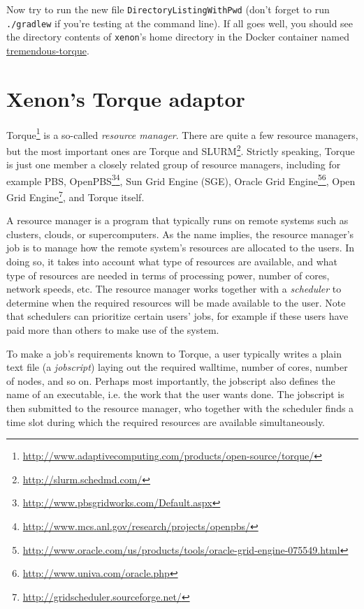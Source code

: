 \documentclass[12pt, a4paper, twoside, openany, titlepage]{book}
\begin{document}
Now try to run the new file \texttt{DirectoryListingWithPwd} (don't forget to run \texttt{./gradlew} if you're testing at the command line). If all goes well, you should see the directory contents of \texttt{xenon}'s home directory in the Docker container named \url{tremendous-torque}.

\section{Xenon's Torque adaptor}

Torque\footnote{\url{http://www.adaptivecomputing.com/products/open-source/torque/}} is a so-called \textit{resource manager}. There are quite a few resource managers, but the most important ones are Torque and SLURM\footnote{\url{http://slurm.schedmd.com/}}. Strictly speaking, Torque is just one member a closely related group of resource managers, including for example PBS, OpenPBS\footnote{\url{http://www.pbsgridworks.com/Default.aspx}}\footnote{\url{http://www.mcs.anl.gov/research/projects/openpbs/}}, Sun Grid Engine (SGE), Oracle Grid Engine\footnote{\url{http://www.oracle.com/us/products/tools/oracle-grid-engine-075549.html}}\footnote{\url{http://www.univa.com/oracle.php}}, Open Grid Engine\footnote{\url{http://gridscheduler.sourceforge.net/}}, and Torque itself.

A resource manager is a program that typically runs on remote systems such as clusters, clouds, or supercomputers. As the name implies, the resource manager's job is to manage how the remote system's resources are allocated to the users. In doing so, it takes into account what type of resources are available, and what type of resources are needed in terms of processing power, number of cores, network speeds, etc. The resource manager works together with a \textit{scheduler} to determine when the required resources will be made available to the user. Note that schedulers can prioritize certain users' jobs, for example if these users have paid more than others to make use of the system.

To make a job's requirements known to Torque, a user typically writes a plain text file (a \textit{jobscript}) laying out the required walltime, number of cores, number of nodes, and so on. Perhaps most importantly, the jobscript also defines the name of an executable, i.e. the work that the user wants done. The jobscript is then submitted to the resource manager, who together with the scheduler finds a time slot during which the required resources are available simultaneously.






\backmatter

\printindex
\end{document}
